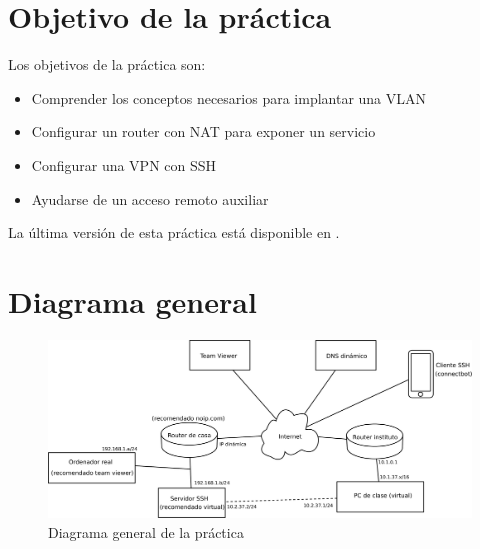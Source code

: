 
\usepackage{eurosym}


\renewcommand{\hmwkClass}{Planificación y Administración de Redes}
\renewcommand{\hmwkTitle}{Práctica VLAN en Cisco}









\primerapagina

\setlength{\parindent}{0em}
\setlength{\parskip}{1em}


\section{Objetivo de la práctica}
Los objetivos de la práctica son:
\begin{itemize}
\item Comprender los conceptos necesarios para implantar una VLAN
\item Configurar un router con NAT para exponer un servicio
\item Configurar una VPN con SSH
\item Ayudarse de un acceso remoto auxiliar
\end{itemize}


La última versión de esta práctica está disponible en .


\section{Diagrama general}

\begin{figure}[h]
  \begin{center}
    \includegraphics[width=.9\textwidth]{./media/practica-vpn-general.pdf}
  \end{center}
  \caption{Diagrama general de la práctica}\label{fig:diagrama-general}
\end{figure}


